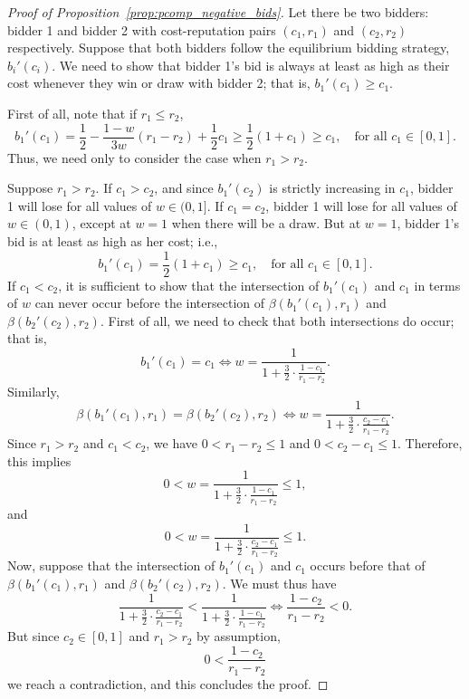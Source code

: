 \begin{proof}[Proof of Proposition~\ref{prop:pcomp_negative_bids}]
Let there be two bidders: bidder 1 and bidder 2 with cost-reputation pairs $(c_1,r_1)$ and $(c_2,r_2)$ respectively. Suppose that both bidders follow the equilibrium bidding strategy, $b_i'(c_i)$. We need to show that bidder 1's bid is always at least as high as their cost whenever they win or draw with bidder 2; that is, $b_1'(c_1)\ge c_1$.

First of all, note that if $r_1\le r_2$,
\begin{equation*}
	b_1'(c_1) = \frac{1}{2}-\frac{1-w}{3w}(r_1-r_2) + \frac{1}{2}c_1 \ge \frac{1}{2}(1+c_1) \ge c_1, \quad\text{for all } c_1\in[0,1].
\end{equation*}
Thus, we need only to consider the case when $r_1>r_2$.

Suppose $r_1>r_2$. If $c_1>c_2$, and since $b_1'(c_2)$ is strictly increasing in $c_1$, bidder 1 will lose for all values of $w\in(0,1]$. If $c_1=c_2$, bidder 1 will lose for all values of $w\in(0,1)$, except at $w=1$ when there will be a draw. But at $w=1$, bidder 1's bid is at least as high as her cost; i.e.,
\begin{equation*}
	b_1'(c_1) = \frac{1}{2}(1+c_1) \ge c_1, \quad\text{for all } c_1\in[0,1].
\end{equation*}
If $c_1<c_2$, it is sufficient to show that the intersection of $b_1'(c_1)$ and $c_1$ in terms of $w$ can never occur before the intersection of $\beta(b_1'(c_1),r_1)$ and $\beta(b_2'(c_2),r_2)$. First of all, we need to check that both intersections do occur; that is,
\begin{equation*}
	b_1'(c_1) = c_1 \iff w = \frac{1}{1 + \frac{3}{2}\cdot\frac{1 - c_1}{r_1 - r_2}}.
\end{equation*}
Similarly,
\begin{equation*}
	\beta(b_1'(c_1),r_1) = \beta(b_2'(c_2),r_2) \iff w = \frac{1}{1+ \frac{3}{2}\cdot\frac{c_2-c_1}{r_1-r_2}}.
\end{equation*}
Since $r_1>r_2$ and $c_1<c_2$, we have $0<r_1-r_2\le 1$ and $0<c_2-c_1\le 1$. Therefore, this implies
\begin{equation*}
	0 < w = \frac{1}{1+ \frac{3}{2}\cdot\frac{1-c_1}{r_1-r_2}} \le 1,
\end{equation*}
and
\begin{equation*}
	0 < w = \frac{1}{1+ \frac{3}{2}\cdot\frac{c_2-c_1}{r_1-r_2}} \le 1.
\end{equation*}
Now, suppose that the intersection of $b_1'(c_1)$ and $c_1$ occurs before that of $\beta(b_1'(c_1),r_1)$ and $\beta(b_2'(c_2),r_2)$. We must thus have
\begin{equation*}
	\frac{1}{1+\frac{3}{2}\cdot\frac{c_2-c_1}{r_1-r_2}} < \frac{1}{1+\frac{3}{2}\cdot\frac{1-c_1}{r_1-r_2}} \iff \frac{1-c_2}{r_1-r_2} < 0.
\end{equation*}
But since $c_2\in[0,1]$ and $r_1>r_2$ by assumption,
\begin{equation*}
	0 < \frac{1-c_2}{r_1-r_2}
\end{equation*}
we reach a contradiction, and this concludes the proof.
\end{proof}

